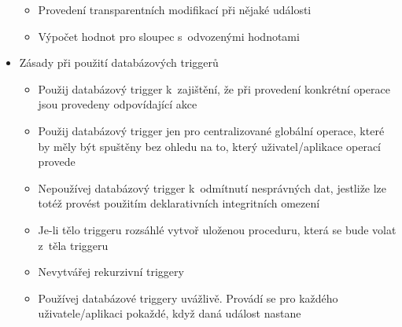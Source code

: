 \documentclass[a4paper,10pt]{article}
\begin{document}
\begin{itemize}
\begin{itemize}
          \item Provedení transparentních modifikací při nějaké události
          \item Výpočet hodnot pro sloupec s~odvozenými hodnotami
        \end{itemize}
        \item Zásady při použití databázových triggerů
        \begin{itemize}
          \item Použij databázový trigger k~zajištění, že při provedení konkrétní operace jsou provedeny odpovídající akce
          \item Použij databázový trigger jen pro centralizované globální operace, které by měly být spuštěny bez ohledu na to, který uživatel/aplikace operací provede
          \item Nepoužívej databázový trigger k~odmítnutí nesprávných dat, jestliže lze totéž provést použitím deklarativních integritních omezení
          \item Je-li tělo triggeru rozsáhlé vytvoř uloženou proceduru, která se bude volat z~těla triggeru
          \item Nevytvářej rekurzivní triggery
          \item Používej databázové triggery uvážlivě. Provádí se pro každého uživatele/aplikaci pokaždé, když daná událost nastane
        \end{itemize}
      \end{itemize}
\end{document}
